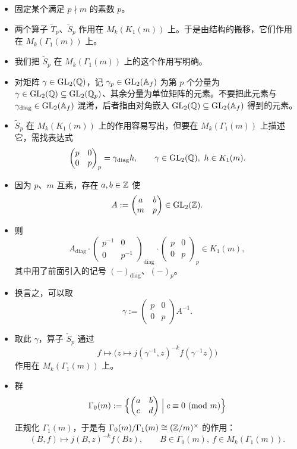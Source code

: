 \begin{itemize}
\item 固定某个满足 $p\nmid m$ 的素数 $p$。
\item 两个算子 $\tilde T_p$、$\tilde S_p$ 作用在 $M_k(K_1(m))$ 上。于是由结构的搬移，它们作用在 $M_k(\Gamma_1(m))$ 上。
\item 我们把 $\tilde S_p$ 在 $M_k(\Gamma_1(m))$ 上的这个作用写明确。
\item 对矩阵 $\gamma\in\operatorname{GL}_2(\mathbb{Q})$，记 $\gamma_p\in\operatorname{GL}_2(\mathbb{A}_f)$ 为第 $p$ 个分量为 $\gamma\in\operatorname{GL}_2(\mathbb{Q})\subseteq\operatorname{GL}_2(\mathbb{Q}_p)$、其余分量为单位矩阵的元素。不要把此元素与 $\gamma_{\mathrm{diag}}\in\operatorname{GL}_2(\mathbb{A}_f)$ 混淆，后者指由对角嵌入 $\operatorname{GL}_2(\mathbb{Q})\subseteq\operatorname{GL}_2(\mathbb{A}_f)$ 得到的元素。
\item $\tilde S_p$ 在 $M_k(K_1(m))$ 上的作用容易写出，但要在 $M_k(\Gamma_1(m))$ 上描述它，需找表达式
\[
\begin{pmatrix}p&0\\0&p\end{pmatrix}_p=\gamma_{\mathrm{diag}}h,\qquad
\gamma\in\operatorname{GL}_2(\mathbb{Q}),\ h\in K_1(m).
\]
\item 因为 $p$、$m$ 互素，存在 $a,b\in\mathbb{Z}$ 使
\[
A:=\begin{pmatrix}a&b\\m&p\end{pmatrix}\in\operatorname{GL}_2(\mathbb{Z}).
\]
\item 则
\[
A_{\mathrm{diag}}\cdot\begin{pmatrix}p^{-1}&0\\0&p^{-1}\end{pmatrix}_{\mathrm{diag}}\cdot
\begin{pmatrix}p&0\\0&p\end{pmatrix}_p\in K_1(m),
\]
其中用了前面引入的记号 $(-)_{\mathrm{diag}}$、$(-)_p$。
\item 换言之，可以取
\[
\gamma:=\begin{pmatrix}p&0\\0&p\end{pmatrix}A^{-1}.
\]
\item 取此 $\gamma$，算子 $\tilde S_p$ 通过
\[
f\mapsto\bigl(z\mapsto j(\gamma^{-1},z)^{-k}f(\gamma^{-1}z)\bigr)
\]
作用在 $M_k(\Gamma_1(m))$ 上。
\item 群
\[
\Gamma_0(m):=\Bigl\{\begin{pmatrix}a&b\\c&d\end{pmatrix}\Bigm|c\equiv0\ (\mathrm{mod}\ m)\Bigr\}
\]
正规化 $\Gamma_1(m)$，于是有 $\Gamma_0(m)/\Gamma_1(m)\cong(\mathbb{Z}/m)^\times$ 的作用：
\[
(B,f)\mapsto j(B,z)^{-k}f(Bz),\qquad B\in\Gamma_0(m),\ f\in M_k(\Gamma_1(m)).
\]
\end{itemize}
